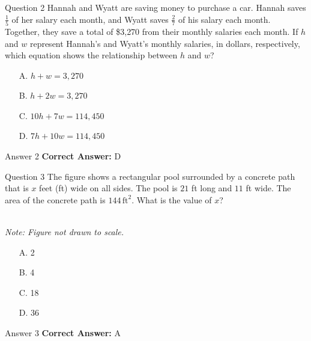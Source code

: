 \documentclass{beamer}
\begin{document}
\begin{frame}{Question 2}
\small
Hannah and Wyatt are saving money to purchase a car. Hannah saves \(\frac{1}{5}\) of her salary each month, and Wyatt saves \(\frac{2}{7}\) of his salary each month. Together, they save a total of \$3{,}270 from their monthly salaries each month. If \(h\) and \(w\) represent Hannah's and Wyatt's monthly salaries, in dollars, respectively, which equation shows the relationship between \(h\) and \(w\)?
\vspace{0.35cm}
\begin{enumerate}
    \item[A.] $h+w=3{,}270$
    \item[B.] $h+2w=3{,}270$
    \item[C.] $10h+7w=114{,}450$
    \item[D.] $7h+10w=114{,}450$
\end{enumerate}
\end{frame}
\begin{frame}{Answer 2}
\small
\textbf{Correct Answer:} D
\end{frame}

\begin{frame}{Question 3}
\small
The figure shows a rectangular pool surrounded by a concrete path that is \(x\) feet (ft) wide on all sides. The pool is \(21\) ft long and \(11\) ft wide. The area of the concrete path is \(144\,\text{ft}^2\). What is the value of \(x\)?

\begin{center}
\\[0.2em]
\textit{Note: Figure not drawn to scale.}
\end{center}
\vspace{0.35cm}
\begin{enumerate}
    \item[A.] 2
    \item[B.] 4
    \item[C.] 18
    \item[D.] 36
\end{enumerate}
\end{frame}
\begin{frame}{Answer 3}
\small
\textbf{Correct Answer:} A
\end{frame}
\end{document}

